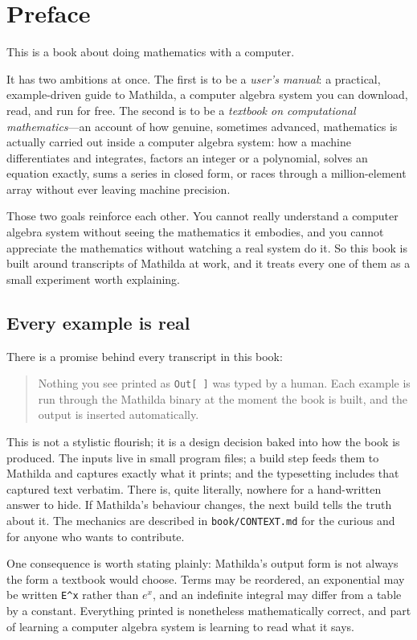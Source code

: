 \chapter{Preface}

This is a book about doing mathematics with a computer.

It has two ambitions at once. The first is to be a \emph{user's manual}: a
practical, example-driven guide to Mathilda, a computer algebra system you can
download, read, and run for free. The second is to be a \emph{textbook on
computational mathematics}---an account of how genuine, sometimes advanced,
mathematics is actually carried out inside a computer algebra system: how a
machine differentiates and integrates, factors an integer or a polynomial,
solves an equation exactly, sums a series in closed form, or races through a
million-element array without ever leaving machine precision.

Those two goals reinforce each other. You cannot really understand a computer
algebra system without seeing the mathematics it embodies, and you cannot
appreciate the mathematics without watching a real system do it. So this book is
built around transcripts of Mathilda at work, and it treats every one of them as
a small experiment worth explaining.

\section*{Every example is real}

There is a promise behind every transcript in this book:

\begin{quote}
Nothing you see printed as \texttt{Out[\,]} was typed by a human. Each example is
run through the Mathilda binary at the moment the book is built, and the output
is inserted automatically.
\end{quote}

This is not a stylistic flourish; it is a design decision baked into how the book
is produced. The inputs live in small program files; a build step feeds them to
Mathilda and captures exactly what it prints; and the typesetting includes that
captured text verbatim. There is, quite literally, nowhere for a hand-written
answer to hide. If Mathilda's behaviour changes, the next build tells the truth
about it. The mechanics are described in \texttt{book/CONTEXT.md} for the curious
and for anyone who wants to contribute.

One consequence is worth stating plainly: Mathilda's output form is not always
the form a textbook would choose. Terms may be reordered, an exponential may be
written \texttt{E\^{}x} rather than $e^{x}$, and an indefinite integral may differ
from a table by a constant. Everything printed is nonetheless mathematically
correct, and part of learning a computer algebra system is learning to read what
it says.

